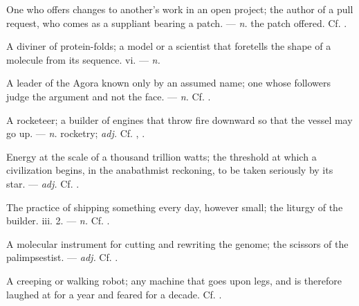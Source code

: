  One who offers changes to another's work in an open project; the author of a pull request, who comes as a suppliant bearing a patch. ---  \textit{n.} the patch offered. Cf. .

 A diviner of protein-folds; a model or a scientist that foretells the shape of a molecule from its sequence.   vi. ---  \textit{n.}

 A leader of the Agora known only by an assumed name; one whose followers judge the argument and not the face.  ---  \textit{n.} Cf. .

 A rocketeer; a builder of engines that throw fire downward so that the vessel may go up. ---  \textit{n.} rocketry;  \textit{adj.} Cf. , .

 Energy at the scale of a thousand trillion watts; the threshold at which a civilization begins, in the anabathmist reckoning, to be taken seriously by its star. ---  \textit{adj.} Cf. .

 The practice of shipping something every day, however small; the liturgy of the builder.   iii. 2. ---  \textit{n.} Cf. .

 A molecular instrument for cutting and rewriting the genome; the scissors of the palimpsestist.  ---  \textit{adj.} Cf. .

 A creeping or walking robot; any machine that goes upon legs, and is therefore laughed at for a year and feared for a decade. Cf. .

